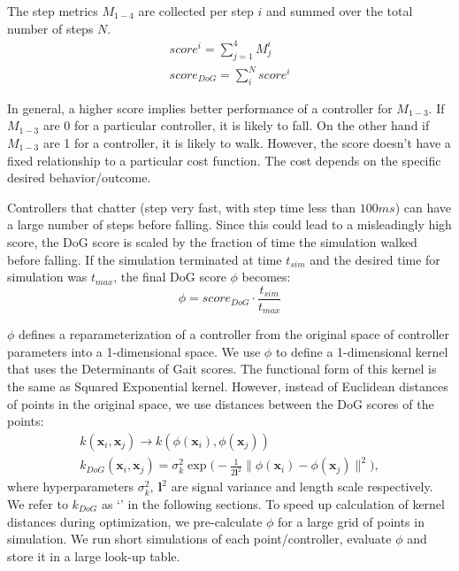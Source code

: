 The step metrics $M_{1-4}$ are collected per step $i$ and summed over the total number of steps $N$. 
\begin{align}
\label{eq:dog}
 score^i = \sum_{j=1}^4 M^i_j  \\
 score_{DoG} = \sum_i^{N} score^i
\end{align}

In general, a higher score implies better performance of a controller for $M_{1-3}$. If $M_{1-3}$ are 0 for a particular controller, it is likely to fall. On the other hand if $M_{1-3}$ are 1 for a controller, it is likely to walk. However, the score doesn't have a fixed relationship to a particular cost function. The cost depends on the specific desired behavior/outcome.

Controllers that chatter (step very fast, with step time less than $100ms$) can have a large number of steps before falling. Since this could lead to a misleadingly high score, the DoG score is scaled by the fraction of time the simulation walked before falling. If the simulation terminated at time $t_{sim}$ and the desired time for simulation was $t_{max}$, the final DoG score $\phi$ becomes:
\begin{equation}
    \phi = score_{DoG} \cdot \frac{t_{sim}}{t_{max}}
\end{equation}

$\phi$ defines a reparameterization of a controller from the original space of controller parameters into a 1-dimensional space. We use $\phi$ to define a 1-dimensional kernel that uses the Determinants of Gait scores. The functional form of this kernel is the same as Squared Exponential kernel. However, instead of Euclidean distances of points in the original space, we use distances between the DoG scores of the points:
\begin{align}
    k(\pmb{x}_i, \pmb{x}_j) \rightarrow k(\phi(\pmb{x}_i), \phi(\pmb{x}_j)) \\
    k_{DoG}(\pmb{x}_i, \pmb{x}_j) = \sigma_k^2 \exp\Big(- \frac{1}{2 \pmb{l}^2} \|\phi(\pmb{x}_i) - \phi(\pmb{x}_j)\|^2 \Big),
\end{align}
where hyperparameters $\sigma_k^2, \ \pmb{l}^2$ are signal variance and length scale respectively. We refer to $k_{DoG}$ as `\dogkernel' in the following sections.
To speed up calculation of kernel distances during optimization, we pre-calculate $\phi$ for a large grid of points in simulation. We run short simulations of each point/controller, evaluate $\phi$ and store it in a large look-up table.


